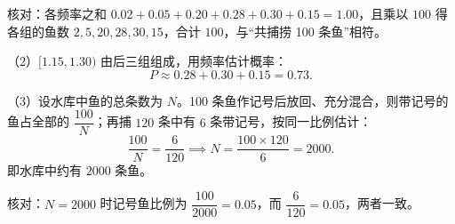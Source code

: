 \begin{answer}
核对：各频率之和 $0.02+0.05+0.20+0.28+0.30+0.15=1.00$，且乘以 $100$ 得各组的鱼数 $2,5,20,28,30,15$，合计 $100$，与“共捕捞 100 条鱼”相符。

（2）$[1.15,1.30)$ 由后三组组成，用频率估计概率：
\nopagebreak[4]
\[P\approx0.28+0.30+0.15=0.73.\]

（3）设水库中鱼的总条数为 $N$。100 条鱼作记号后放回、充分混合，则带记号的鱼占全部的 $\dfrac{100}{N}$；再捕 $120$ 条中有 $6$ 条带记号，按同一比例估计：
\nopagebreak[4]
\[\frac{100}{N}=\frac{6}{120}\implies N=\frac{100\times120}{6}=2000.\]
即水库中约有 $2000$ 条鱼。

核对：$N=2000$ 时记号鱼比例为 $\dfrac{100}{2000}=0.05$，而 $\dfrac{6}{120}=0.05$，两者一致。


\end{answer}

